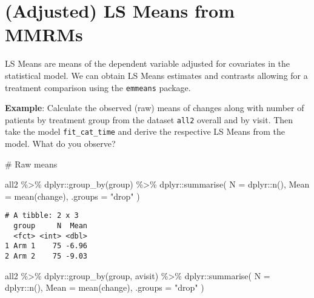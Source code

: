 \documentclass[
  letterpaper,
  DIV=11,
  numbers=noendperiod]{scrreprt}
\newenvironment{Shaded}{\begin{snugshade}}{\end{snugshade}}
\newcommand{\AttributeTok}[1]{\textcolor[rgb]{0.40,0.45,0.13}{#1}}
\newcommand{\CommentTok}[1]{\textcolor[rgb]{0.37,0.37,0.37}{#1}}
\newcommand{\FunctionTok}[1]{\textcolor[rgb]{0.28,0.35,0.67}{#1}}
\newcommand{\NormalTok}[1]{\textcolor[rgb]{0.00,0.23,0.31}{#1}}
\newcommand{\SpecialCharTok}[1]{\textcolor[rgb]{0.37,0.37,0.37}{#1}}
\newcommand{\StringTok}[1]{\textcolor[rgb]{0.13,0.47,0.30}{#1}}
\begin{document}
\hypertarget{adjusted-ls-means-from-mmrms}{%
\section{(Adjusted) LS Means from
MMRMs}\label{adjusted-ls-means-from-mmrms}}

LS Means are means of the dependent variable adjusted for covariates in
the statistical model. We can obtain LS Means estimates and contrasts
allowing for a treatment comparison using the \texttt{emmeans} package.

\textbf{Example}: Calculate the observed (raw) means of changes along
with number of patients by treatment group from the dataset
\texttt{all2} overall and by visit. Then take the model
\texttt{fit\_cat\_time} and derive the respective LS Means from the
model. What do you observe?

\begin{Shaded}
\begin{Highlighting}[]
\CommentTok{\# Raw means}

\NormalTok{all2 }\SpecialCharTok{\%\textgreater{}\%} 
\NormalTok{  dplyr}\SpecialCharTok{::}\FunctionTok{group\_by}\NormalTok{(group) }\SpecialCharTok{\%\textgreater{}\%} 
\NormalTok{  dplyr}\SpecialCharTok{::}\FunctionTok{summarise}\NormalTok{(}
    \AttributeTok{N =}\NormalTok{ dplyr}\SpecialCharTok{::}\FunctionTok{n}\NormalTok{(),}
    \AttributeTok{Mean =} \FunctionTok{mean}\NormalTok{(change),}
    \AttributeTok{.groups =} \StringTok{"drop"}
\NormalTok{  )}
\end{Highlighting}
\end{Shaded}

\begin{verbatim}
# A tibble: 2 x 3
  group     N  Mean
  <fct> <int> <dbl>
1 Arm 1    75 -6.96
2 Arm 2    75 -9.03
\end{verbatim}

\begin{Shaded}
\begin{Highlighting}[]
\NormalTok{all2 }\SpecialCharTok{\%\textgreater{}\%} 
\NormalTok{  dplyr}\SpecialCharTok{::}\FunctionTok{group\_by}\NormalTok{(group, avisit) }\SpecialCharTok{\%\textgreater{}\%} 
\NormalTok{  dplyr}\SpecialCharTok{::}\FunctionTok{summarise}\NormalTok{(}
    \AttributeTok{N =}\NormalTok{ dplyr}\SpecialCharTok{::}\FunctionTok{n}\NormalTok{(),}
    \AttributeTok{Mean =} \FunctionTok{mean}\NormalTok{(change),}
    \AttributeTok{.groups =} \StringTok{"drop"}
\NormalTok{  )}
\end{Highlighting}
\end{Shaded}
\end{document}
